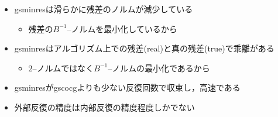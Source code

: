 \begin{itemize}
	\item gsminresは滑らかに残差のノルムが減少している
		\begin{itemize}
			\item 残差の$B^{-1}$--ノルムを最小化しているから
		\end{itemize}
	\item gsminresはアルゴリズム上での残差(real)と真の残差(true)で乖離がある
		\begin{itemize}
			\item $2$--ノルムではなく$B^{-1}$--ノルムの最小化であるから
		\end{itemize}
	\item gsminresがgscocgよりも少ない反復回数で収束し，高速である
	\item 外部反復の精度は内部反復の精度程度しかでない
\end{itemize}


